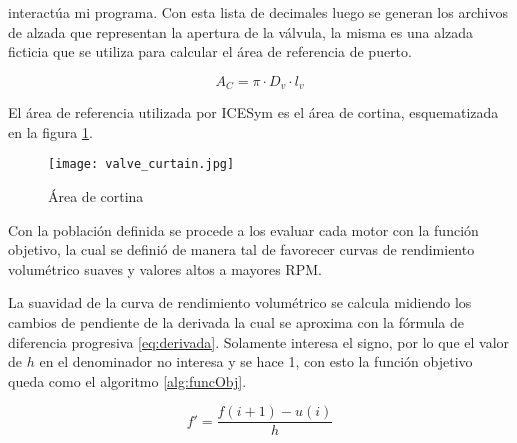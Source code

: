 interactúa mi programa.  Con esta lista de decimales luego se generan los
archivos de alzada que representan la apertura de la válvula, la misma es una
alzada ficticia que se utiliza para calcular el área de referencia de puerto.

\begin{equation}
  A_{C} = \pi \cdot D_{v}\cdot l_{v}
\end{equation}

El área de referencia utilizada por ICESym es el área de cortina, esquematizada
en la figura \ref{fig:area_cortina}.

\begin{figure}
  \centering
  \texttt{[image: valve\_curtain.jpg]}
  \caption{Área de cortina}
  \label{fig:area_cortina}
\end{figure}

Con la población definida se procede a los evaluar cada motor con la función
objetivo, la cual se definió de manera tal de favorecer curvas de rendimiento
volumétrico suaves y valores altos a mayores RPM.

La suavidad de la curva de rendimiento volumétrico se calcula midiendo los
cambios de pendiente de la derivada la cual se aproxima con la fórmula de
diferencia progresiva \ref{eq:derivada}.
%
Solamente interesa el signo, por lo que el valor de $h$ en el denominador no
interesa y se hace 1, con esto la función objetivo queda como el algoritmo
\ref{alg:funcObj}.

\begin{equation}
  f' = \frac{f(i+1) - u(i)}{h}
  \label{eq:derivada}
\end{equation}


%
%
%
%
%
%

